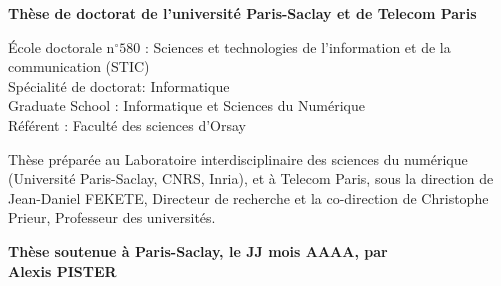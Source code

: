 \documentclass[12pt,a4paper]{book}
\begin{document}
\begin{titlepage}
        \normalsize
        \textbf{Thèse de doctorat de l'université Paris-Saclay et de Telecom Paris} \\

        \vspace{6mm}

        \small École doctorale n$^{\circ}580$ : Sciences et technologies de l’information et de la communication (STIC)\\
        \small Spécialité de doctorat: Informatique\\
        \small Graduate School : Informatique et Sciences du Numérique\\
        \small Référent : Faculté des sciences d’Orsay \\
        \vspace{6mm}


        \footnotesize Thèse préparée au Laboratoire interdisciplinaire des sciences du numérique (Université Paris-Saclay, CNRS, Inria), et à Telecom Paris, sous la direction de Jean-Daniel FEKETE, Directeur de recherche et la co-direction de Christophe Prieur, Professeur des universités. \\

        \vspace{15mm}

        \textbf{Thèse soutenue à Paris-Saclay, le JJ mois AAAA, par}\\
        \bigskip
        \Large {\color{Prune} \textbf{Alexis PISTER}} %

        \vspace{\fill} %

        \bigskip


\end{titlepage}
\end{document}
